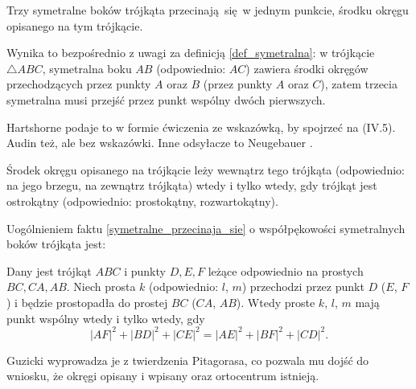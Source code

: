 \begin{proposition}
    \label{symetralne_przecinaja_sie}
    Trzy symetralne boków trójkąta przecinają się w jednym punkcie, środku okręgu opisanego na tym trójkącie.
\end{proposition}

Wynika to bezpośrednio z uwagi za definicją \ref{def_symetralna}: w trójkącie $\triangle ABC$, symetralna boku $AB$ (odpowiednio: $AC$) zawiera środki okręgów przechodzących przez punkty $A$ oraz $B$ (przez punkty $A$ oraz $C$), zatem trzecia symetralna musi przejść przez punkt wspólny dwóch pierwszych.

Hartshorne \cite[s. 16]{hartshorne2000} podaje to w formie ćwiczenia ze wskazówką, by spojrzeć na (IV.5).
Audin \cite[s. 61]{audin_2003} też, ale bez wskazówki.
Inne odsyłacze to Neugebauer \cite[s. 19]{neugebauer_2018}.

\begin{proposition}
	Środek okręgu opisanego na trójkącie leży wewnątrz tego trójkąta (odpowiednio: na jego brzegu, na zewnątrz trójkąta) wtedy i tylko wtedy, gdy trójkąt jest ostrokątny (odpowiednio: prostokątny, rozwartokątny).
\end{proposition}

Uogólnieniem faktu \ref{symetralne_przecinaja_sie} o współpękowości symetralnych boków trójkąta jest:

\begin{theorem}[Carnota]
%
\label{guzicki_6_13}%
	Dany jest trójkąt $ABC$ i punkty $D, E, F$ leżące odpowiednio na prostych $BC, CA, AB$.
	Niech prosta $k$ (odpowiednio: $l$, $m$) przechodzi przez punkt $D$ ($E$, $F$) i będzie prostopadła do prostej $BC$ ($CA$, $AB$).
	Wtedy proste $k$, $l$, $m$ mają punkt wspólny wtedy i tylko wtedy, gdy
	\begin{equation}
		|AF|^2 + |BD|^2 + |CE|^2 = |AE|^2 + |BF|^2 + |CD|^2.
	\end{equation}
\end{theorem}

Guzicki \cite[s. 176]{guzicki_2021} wyprowadza je z twierdzenia Pitagorasa, co pozwala mu dojść do wniosku, że okręgi opisany i wpisany oraz ortocentrum istnieją.
